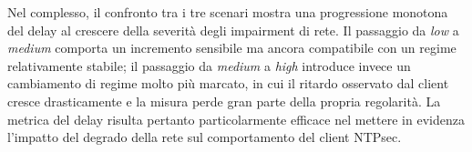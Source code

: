 Nel complesso, il confronto tra i tre scenari mostra una progressione monotona del
delay al crescere della severità degli impairment di rete. Il passaggio da
\textit{low} a \textit{medium} comporta un incremento sensibile ma ancora
compatibile con un regime relativamente stabile; il passaggio da \textit{medium}
a \textit{high} introduce invece un cambiamento di regime molto più marcato, in
cui il ritardo osservato dal client cresce drasticamente e la misura perde gran
parte della propria regolarità. La metrica del delay risulta pertanto particolarmente
efficace nel mettere in evidenza l’impatto del degrado della rete sul comportamento
del client NTPsec.